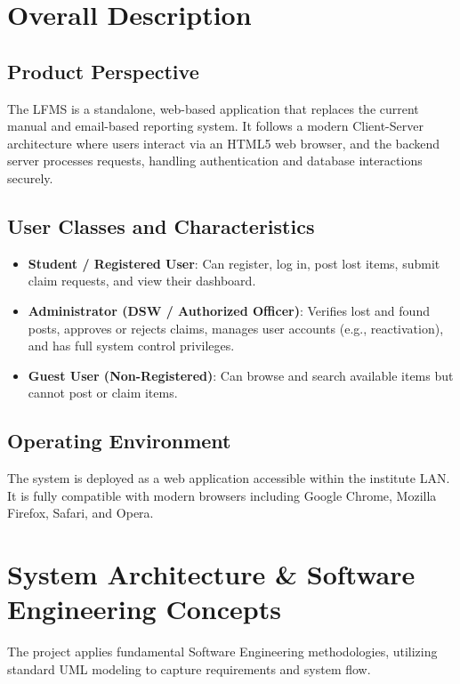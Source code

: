 \documentclass[12pt, a4paper]{article}
\begin{document}
\section{Overall Description}
\subsection{Product Perspective}
The LFMS is a standalone, web-based application that replaces the current manual and email-based reporting system. It follows a modern Client-Server architecture where users interact via an HTML5 web browser, and the backend server processes requests, handling authentication and database interactions securely.

\subsection{User Classes and Characteristics}
\begin{itemize}
    \item \textbf{Student / Registered User}: Can register, log in, post lost items, submit claim requests, and view their dashboard.
    \item \textbf{Administrator (DSW / Authorized Officer)}: Verifies lost and found posts, approves or rejects claims, manages user accounts (e.g., reactivation), and has full system control privileges.
    \item \textbf{Guest User (Non-Registered)}: Can browse and search available items but cannot post or claim items.
\end{itemize}

\subsection{Operating Environment}
The system is deployed as a web application accessible within the institute LAN. It is fully compatible with modern browsers including Google Chrome, Mozilla Firefox, Safari, and Opera.

\section{System Architecture \& Software Engineering Concepts}
The project applies fundamental Software Engineering methodologies, utilizing standard UML modeling to capture requirements and system flow.
\end{document}
